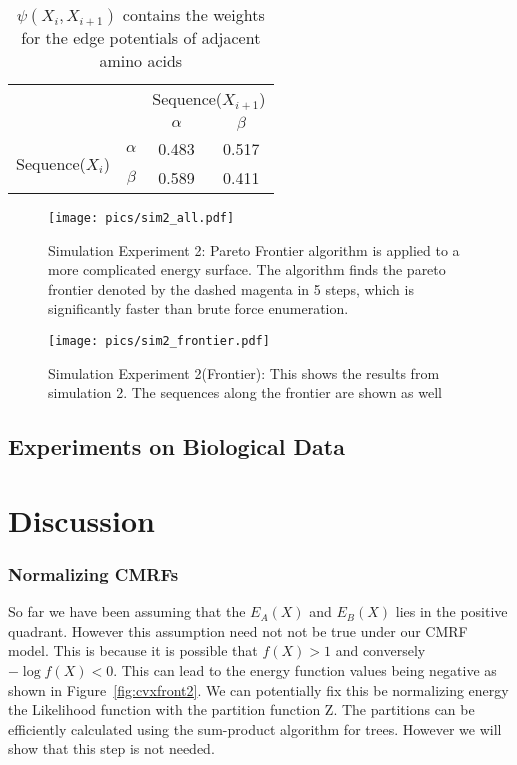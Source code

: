 \documentclass{article}
\begin{document}
\begin{table}
\begin{center}
\begin{tabular}{cc|c|c|}
\cline{3-4}
& & \multicolumn{2}{c|}{Sequence($X_{i+1}$)} \\ \cline{3-4}
& & $\alpha$ & $\beta$  \\ \cline{1-4}
\multicolumn{1}{|c|}{\multirow{2}{*}{Sequence($X_i$)}} &
\multicolumn{1}{|c|}{$\alpha$} & 0.483 & 0.517      \\ \cline{2-4}
\multicolumn{1}{|c|}{}                        &
\multicolumn{1}{|c|}{$\beta$} & 0.589 & 0.411      \\ \cline{1-4}
\end{tabular}
\end{center}
\caption{$\psi(X_i,X_{i+1})$ contains the weights for the edge potentials of adjacent amino acids}
\label{tab:psi4}
\end{table}


\begin{figure}[h!]
    \centering
    \texttt{[image: pics/sim2\_all.pdf]}
    \caption{Simulation Experiment 2: Pareto Frontier algorithm is applied to a more complicated energy surface. The algorithm finds the pareto frontier denoted by the dashed magenta in 5 steps, which is significantly faster than brute force enumeration.  }
    \label{fig:sim2_all}
\end{figure}

\begin{figure}[h!]
    \centering
    \texttt{[image: pics/sim2\_frontier.pdf]}
    \caption{Simulation Experiment 2(Frontier): This shows the results from simulation 2. The sequences along the frontier are shown as well }
    \label{fig:sim2_frontier}
\end{figure}

\pagebreak
\clearpage

\subsection{Experiments on Biological Data}

\section{Discussion}


\subsubsection{Normalizing CMRFs}
So far we have been assuming that the $E_A(X)$ and $E_B(X)$ lies in the positive quadrant. However this assumption need not not be true under our CMRF model. This is because it is possible that $f(X) > 1$ and conversely $-\log f(X) < 0$. This can lead to the energy function values being negative as shown in Figure~\ref{fig:cvxfront2}. We can potentially fix this be normalizing energy the Likelihood function with the partition function Z. The partitions can be efficiently calculated using the sum-product algorithm for trees. However we will show that this step is not needed. 
\end{document}
